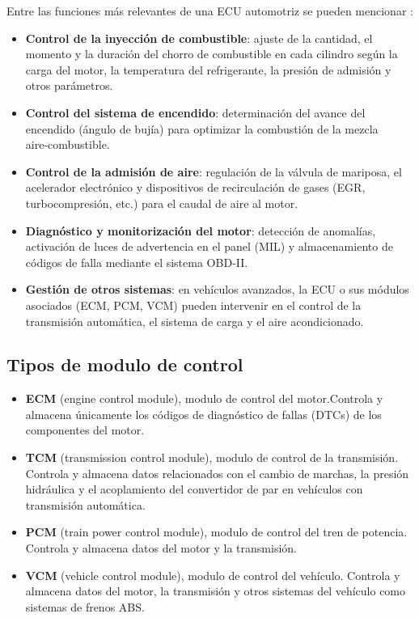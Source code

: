 Entre las funciones más relevantes de una ECU automotriz se pueden mencionar \citep{Bosch_EngineManagement, ClubAuto_ECUfuncionamiento, Autoavance_ECU2020}:

\begin{itemize}
  \item \textbf{Control de la inyección de combustible}: ajuste de la cantidad, el momento y la duración del chorro de combustible en cada cilindro según la carga del motor, la temperatura del refrigerante, la presión de admisión y otros parámetros.
  \item \textbf{Control del sistema de encendido}: determinación del avance del encendido (ángulo de bujía) para optimizar la combustión de la mezcla aire‑combustible.
  \item \textbf{Control de la admisión de aire}: regulación de la válvula de mariposa, el acelerador electrónico y dispositivos de recirculación de gases (EGR, turbocompresión, etc.) para el caudal de aire al motor.
  \item \textbf{Diagnóstico y monitorización del motor}: detección de anomalías, activación de luces de advertencia en el panel (MIL) y almacenamiento de códigos de falla mediante el sistema OBD‑II.
  \item \textbf{Gestión de otros sistemas}: en vehículos avanzados, la ECU o sus módulos asociados (ECM, PCM, VCM) pueden intervenir en el control de la transmisión automática, el sistema de carga y el aire acondicionado.
\end{itemize}

\subsection{Tipos de modulo de control}
\begin{itemize}
    \item \textbf{ECM} (engine control module), modulo de control del motor.Controla y almacena únicamente los códigos de diagnóstico de fallas (DTCs) de los componentes del motor.
    \item \textbf{TCM} (transmission control module), modulo de control de la transmisión. Controla y almacena datos relacionados con el cambio de marchas, la presión hidráulica y el acoplamiento del convertidor de par en vehículos con transmisión automática.
    \item \textbf{PCM} (train power control module), modulo de control del tren de potencia. Controla y almacena datos del motor y la transmisión.
    \item \textbf{VCM} (vehicle control module), modulo de control del vehículo. Controla y almacena datos del motor, la transmisión y otros sistemas del vehículo como sistemas de frenos ABS.\citep{poudel2018design}
\end{itemize}

